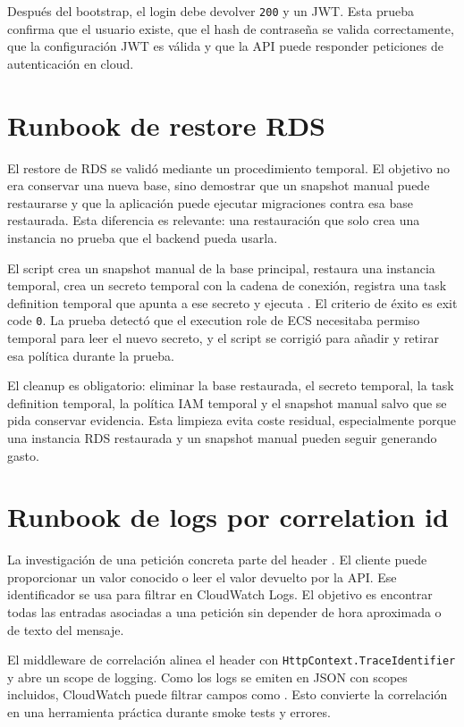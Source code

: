 Después del bootstrap, el login debe devolver \texttt{200} y un JWT. Esta prueba confirma que el usuario existe, que el hash de contraseña se valida correctamente, que la configuración JWT es válida y que la API puede responder peticiones de autenticación en cloud.

\section{Runbook de restore RDS}
\label{sec:runbook-restore-rds}

El restore de RDS se validó mediante un procedimiento temporal. El objetivo no era conservar una nueva base, sino demostrar que un snapshot manual puede restaurarse y que la aplicación puede ejecutar migraciones contra esa base restaurada. Esta diferencia es relevante: una restauración que solo crea una instancia no prueba que el backend pueda usarla.

El script  crea un snapshot manual de la base principal, restaura una instancia temporal, crea un secreto temporal con la cadena de conexión, registra una task definition temporal que apunta a ese secreto y ejecuta . El criterio de éxito es exit code \texttt{0}. La prueba detectó que el execution role de ECS necesitaba permiso temporal para leer el nuevo secreto, y el script se corrigió para añadir y retirar esa política durante la prueba.

El cleanup es obligatorio: eliminar la base restaurada, el secreto temporal, la task definition temporal, la política IAM temporal y el snapshot manual salvo que se pida conservar evidencia. Esta limpieza evita coste residual, especialmente porque una instancia RDS restaurada y un snapshot manual pueden seguir generando gasto.

\section{Runbook de logs por correlation id}
\label{sec:runbook-correlation}

La investigación de una petición concreta parte del header . El cliente puede proporcionar un valor conocido o leer el valor devuelto por la API. Ese identificador se usa para filtrar en CloudWatch Logs. El objetivo es encontrar todas las entradas asociadas a una petición sin depender de hora aproximada o de texto del mensaje.

El middleware de correlación alinea el header con \texttt{HttpContext.TraceIdentifier} y abre un scope de logging. Como los logs se emiten en JSON con scopes incluidos, CloudWatch puede filtrar campos como . Esto convierte la correlación en una herramienta práctica durante smoke tests y errores.

